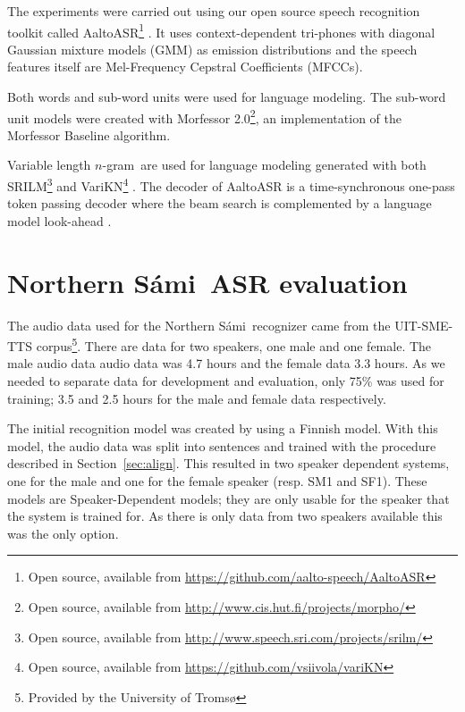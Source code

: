 \documentclass[b5paper]{article}
\newcommand{\ns}{Northern Sámi}
\newcommand{\ngram}{$n$-gram}
\begin{document}
The experiments were carried out using our open source speech recognition toolkit called AaltoASR\footnote{Open source, available from \url{https://github.com/aalto-speech/AaltoASR}} \cite{hirsimaki2009importance}\cite{pylkkonen2005efficient}. It uses context-dependent tri-phones with diagonal Gaussian mixture models (GMM) as emission distributions and the speech features itself are Mel-Frequency Cepstral Coefficients (MFCCs). 

Both words and sub-word units were used for language modeling. The sub-word unit models were created with Morfessor 2.0\footnote{Open source, available from \url{http://www.cis.hut.fi/projects/morpho/}}, an implementation of the Morfessor Baseline algorithm\cite{virpioja2013morfessor}. 

Variable length \ngram\ are used for language modeling generated with both SRILM\footnote{Open source, available from \url{http://www.speech.sri.com/projects/srilm/}} \cite{stolcke2002srilm} and VariKN\footnote{Open source, available from \url{https://github.com/vsiivola/variKN}} \cite{siivola2007growing,siivola2007morfessor}. The decoder of AaltoASR is a time-synchronous one-pass token passing decoder where the beam search is complemented by a language model look-ahead \cite{ortmanns1997look}.




\section{\ns\ ASR evaluation} 
\label{sec:samiexp}
The audio data used for the \ns\ recognizer came from the UIT-SME-TTS corpus\footnote{Provided by the University of Tromsø}. There are data for two speakers, one male and one female. The male audio data audio data was 4.7 hours and the female data 3.3 hours. As we needed to separate data for development and evaluation, only 75\% was used for training; 3.5 and 2.5 hours for the male and female data respectively.

The initial recognition model was created by using a Finnish model. With this model, the audio data was split into sentences and trained with the procedure described in Section~\ref{sec:align}. This resulted in two speaker dependent systems, one for the male and one for the female speaker (resp. SM1 and SF1). These models are Speaker-Dependent models; they are only usable for the speaker that the system is trained for. As there is only data from two speakers available this was the only option. 
\end{document}
